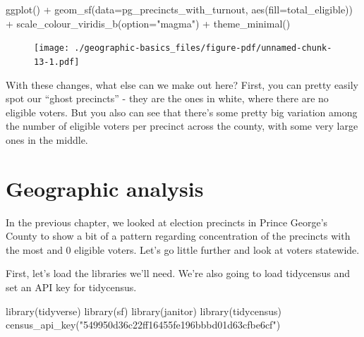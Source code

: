 \documentclass[
  letterpaper,
  DIV=11,
  numbers=noendperiod]{scrreprt}
\newenvironment{Shaded}{\begin{snugshade}}{\end{snugshade}}
\newcommand{\AttributeTok}[1]{\textcolor[rgb]{0.40,0.45,0.13}{#1}}
\newcommand{\FunctionTok}[1]{\textcolor[rgb]{0.28,0.35,0.67}{#1}}
\newcommand{\NormalTok}[1]{\textcolor[rgb]{0.00,0.23,0.31}{#1}}
\newcommand{\SpecialCharTok}[1]{\textcolor[rgb]{0.37,0.37,0.37}{#1}}
\newcommand{\StringTok}[1]{\textcolor[rgb]{0.13,0.47,0.30}{#1}}
\begin{document}
\begin{Shaded}
\begin{Highlighting}[]
\FunctionTok{ggplot}\NormalTok{() }\SpecialCharTok{+}
  \FunctionTok{geom\_sf}\NormalTok{(}\AttributeTok{data=}\NormalTok{pg\_precincts\_with\_turnout, }\FunctionTok{aes}\NormalTok{(}\AttributeTok{fill=}\NormalTok{total\_eligible)) }\SpecialCharTok{+}
  \FunctionTok{scale\_colour\_viridis\_b}\NormalTok{(}\AttributeTok{option=}\StringTok{"magma"}\NormalTok{) }\SpecialCharTok{+}
  \FunctionTok{theme\_minimal}\NormalTok{()}
\end{Highlighting}
\end{Shaded}

\begin{figure}[H]

{\centering \texttt{[image: ./geographic-basics\_files/figure-pdf/unnamed-chunk-13-1.pdf]}

}

\end{figure}

With these changes, what else can we make out here? First, you can
pretty easily spot our ``ghost precincts'' - they are the ones in white,
where there are no eligible voters. But you also can see that there's
some pretty big variation among the number of eligible voters per
precinct across the county, with some very large ones in the middle.


\hypertarget{geographic-analysis}{%
\chapter{Geographic analysis}\label{geographic-analysis}}

In the previous chapter, we looked at election precincts in Prince
George's County to show a bit of a pattern regarding concentration of
the precincts with the most and 0 eligible voters. Let's go little
further and look at voters statewide.

First, let's load the libraries we'll need. We're also going to load
tidycensus and set an API key for tidycensus.

\begin{Shaded}
\begin{Highlighting}[]
\FunctionTok{library}\NormalTok{(tidyverse)}
\FunctionTok{library}\NormalTok{(sf)}
\FunctionTok{library}\NormalTok{(janitor)}
\FunctionTok{library}\NormalTok{(tidycensus)}
\FunctionTok{census\_api\_key}\NormalTok{(}\StringTok{"549950d36c22ff16455fe196bbbd01d63cfbe6cf"}\NormalTok{)}
\end{Highlighting}
\end{Shaded}
\end{document}
